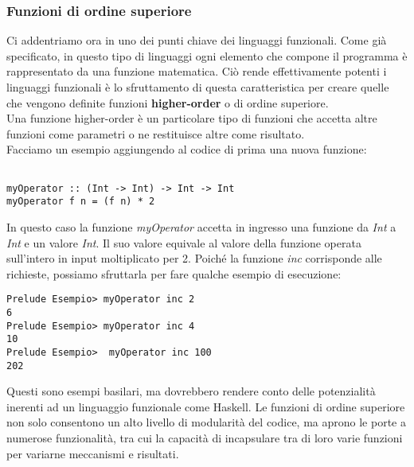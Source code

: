 \subsubsection{Funzioni di ordine superiore}
Ci addentriamo ora in uno dei punti chiave dei linguaggi funzionali. Come già specificato, in questo tipo di linguaggi ogni elemento che compone il programma è rappresentato da una funzione matematica. Ciò rende effettivamente potenti i linguaggi funzionali è lo sfruttamento di questa caratteristica per creare quelle che vengono definite funzioni \textbf{higher-order} o di ordine superiore.\\
Una funzione higher-order è un particolare tipo di funzioni che accetta altre funzioni come parametri o ne restituisce altre come risultato.\\
Facciamo un esempio aggiungendo al codice di prima una nuova funzione:
\begin{verbatim}

myOperator :: (Int -> Int) -> Int -> Int
myOperator f n = (f n) * 2 

\end{verbatim}
In questo caso la funzione \textit{myOperator} accetta in ingresso una funzione da \textit{Int} a \textit{Int} e un valore \textit{Int}. Il suo valore equivale al valore della funzione operata sull'intero in input moltiplicato per 2. Poiché la funzione \textit{inc} corrisponde alle richieste, possiamo sfruttarla per fare qualche esempio di esecuzione:
\begin{verbatim}
Prelude Esempio> myOperator inc 2
6
Prelude Esempio> myOperator inc 4
10
Prelude Esempio>  myOperator inc 100
202
\end{verbatim}
Questi sono esempi basilari, ma dovrebbero rendere conto delle potenzialità inerenti ad un linguaggio funzionale come Haskell. Le funzioni di ordine superiore non solo consentono un alto livello di modularità del codice, ma aprono le porte a numerose funzionalità, tra cui la capacità di incapsulare tra di loro varie funzioni per variarne meccanismi e risultati.
